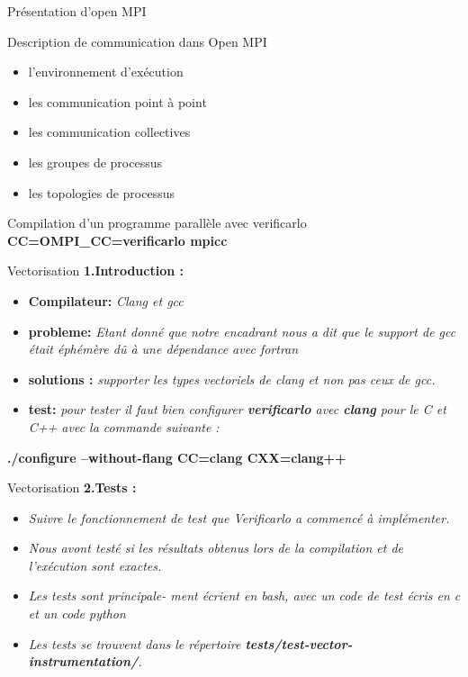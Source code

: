 \documentclass{beamer}
\begin{document}
\begin{frame}{Présentation d'open MPI}
    \begin{block}{Description de communication dans Open MPI}
      \begin{itemize}
          \item l’environnement d’exécution
          \item les communication point à point
          \item les communication collectives
          \item les groupes de processus
          \item les topologies de processus
      \end{itemize}
    \end{block}
    
    \begin{block}{Compilation d’un programme parallèle avec verificarlo}
      \textbf{CC=OMPI\_CC=verificarlo mpicc}
    \end{block}
\end{frame}

\begin{frame}{Vectorisation}
\textbf{1.Introduction :}
  \begin{itemize}
        \item \textbf{Compilateur:} \textit{ Clang et gcc} 
        \item \textbf{probleme:} \textit{ Etant donné que notre encadrant nous a dit que le support de
gcc était éphémère dû à une dépendance avec fortran}
         \item \textbf{solutions : } \textit{supporter les types vectoriels de clang et non pas ceux de gcc. }
         \item \textbf{test: } \textit{ pour tester il faut bien configurer \textbf{verificarlo} avec \textbf {clang} pour le C et C++ avec la commande suivante : }
         \end{itemize}
         \begin{center}
        \textbf{\color{blue} ./configure --without-flang CC=clang CXX=clang++ }      
          \end{center}
     
    
\end{frame}

\begin{frame}{Vectorisation}
\textbf{2.Tests :}
  \begin{itemize}
        \item\textit{ Suivre le fonctionnement de test que
Verificarlo a commencé à implémenter. } 
         \item\textit{Nous avont testé si les résultats obtenus lors de la compilation et de l’exécution sont exactes.} 
        
         \item \textit{Les tests sont principale-
ment écrient en bash, avec un code de test écris en c et un code python}  
         \item \textit{Les tests se trouvent dans
le répertoire \textbf{ tests/test-vector-instrumentation/}.} 
         \end{itemize}
\end{frame}
\end{document}

